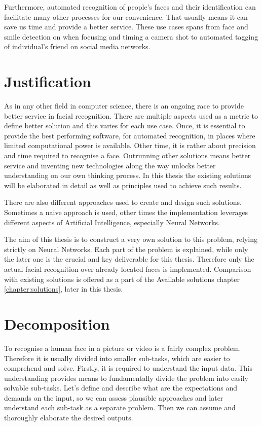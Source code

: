 Furthermore, automated recognition of people's faces and their identification can facilitate many other processes for our convenience. That usually means it can save us time and provide a better service. These use cases spans from face and smile detection on when focusing and timing a camera shot to automated tagging of individual's friend on social media networks.

\section{Justification}

As in any other field in computer science, there is an ongoing race to provide better service in facial recognition. There are multiple aspects used as a metric to define better solution and this varies for each use case. Once, it is essential to provide the best performing software, for automated recognition, in places where limited computational power is available. Other time, it is rather about precision and time required to recognise a face. Outrunning other solutions means better service and inventing new technologies along the way unlocks better understanding on our own thinking process. In this thesis the existing solutions will be elaborated in detail as well as principles used to achieve such results.

There are also different approaches used to create and design such solutions. Sometimes a naive approach is used, other times the implementation leverages different aspects of Artificial Intelligence, especially Neural Networks.

The aim of this thesis is to construct a very own solution to this problem, relying strictly on Neural Networks. Each part of the problem is explained, while only the later one is the crucial and key deliverable for this thesis. Therefore only the actual facial recognition over already located faces is implemented. Comparison with existing solutions is offered as a part of the Available solutions chapter\,\ref{chapter:solutions}, later in this thesis.

\section{Decomposition}

To recognise a human face in a picture or video is a fairly complex problem. Therefore it is usually divided into smaller sub-tasks, which are easier to comprehend and solve. Firstly, it is required to understand the input data. This understanding provides means to fundamentally divide the problem into easily solvable sub-tasks. Let's define and describe what are the expectations and demands on the input, so we can assess plausible approaches and later understand each sub-task as a separate problem. Then we can assume and thoroughly elaborate the desired outputs.

